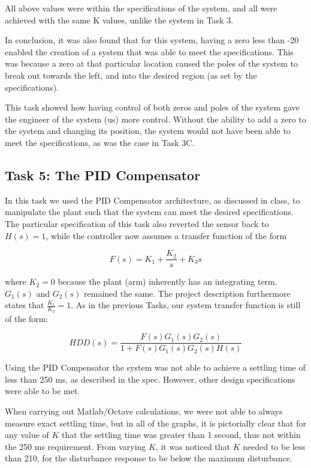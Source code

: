 \documentclass{article}
\begin{document}
All above values were within the specifications of the system, and all were
achieved with the same K values, unlike the system in Task 3.

In conclusion, it was also found that for this system, having a zero less than
-20 enabled the creation of a system that was able to meet the specifications.
This was because a zero at that particular location caused the poles of the
system to break out towards the left, and into the desired region (as set by
the specifications).

This task showed how having control of both zeros and poles of the system gave
the engineer of the system (us) more control. Without the ability to add a
zero to the system and changing its position, the system would not have been
able to meet the specifications, as was the case in Task 3C.

\subsection*{Task 5: The PID Compensator}

In this task we used the PID Compensator architecture, as discussed in class,
to manipulate the plant such that the system can meet the desired specifications.
The particular specification of this task also reverted the sensor back
to $H(s) = 1$, while the controller now assumes a transfer function of the form

$$ F(s) = K_1 + \frac{K_2}{s}  + K_3s $$

\noindent
where $K_2 = 0$ because the plant (arm) inherently has an integrating
term. $G_1(s)$ and $G_2(s)$ remained the same. The project description 
furthermore states that $\frac{K_1}{K_3} = 1$. As in the previous Tasks, our 
system transfer function is still of the form:

$$HDD(s) = \frac{F(s)G_1(s)G_2(s)}{1 + F(s)G_1(s)G_2(s)H(s)}$$

Using the PID Compensator the system was not able to achieve a settling time
of less than 250 ms, as described in the spec. However, other design
specifications were able to be met. 

When carrying out Matlab/Octave calculations, we were not able to always
measure exact settling time, but in all of the graphs, it is pictorially clear
that for any value of $K$ that the settling time was greater than 1 second, thus
not within the 250 ms requirement. From varying $K$, it was noticed that $K$
needed to be less than 210, for the disturbance response to be below the maximum
disturbance. 
\end{document}

